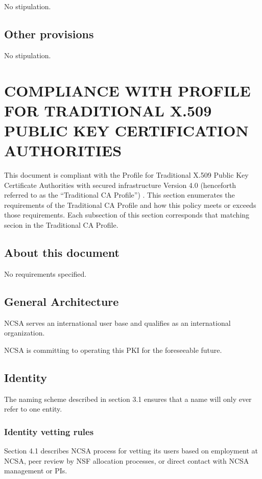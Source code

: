 \documentclass[10pt]{article}
\begin{document}
No stipulation.

\subsection{Other provisions}

No stipulation.

\section{COMPLIANCE WITH PROFILE FOR TRADITIONAL X.509 PUBLIC KEY  CERTIFICATION AUTHORITIES}

This document is compliant with the Profile for Traditional X.509
Public Key Certificate Authorities with secured infrastructure Version
4.0 (henceforth referred to as the ``Traditional CA Profile'') . This
section enumerates the requirements of the Traditional CA Profile and
how this policy meets or exceeds those requirements. Each subsection
of this section corresponds that matching secion in the Traditional CA
Profile.

\subsection{About this document}

No requirements specified.

\subsection{General Architecture}

NCSA serves an international user base and qualifies as an
international organization.

NCSA is committing to operating this PKI for the foreseeable future.

\subsection{Identity}

The naming scheme described in section 3.1 ensures that a name will
only ever refer to one entity.

\subsubsection{Identity vetting rules}

Section 4.1 describes NCSA process for vetting its users based on
employment at NCSA, peer review by NSF allocation processes, or direct
contact with NCSA management or PIs.
\end{document}
